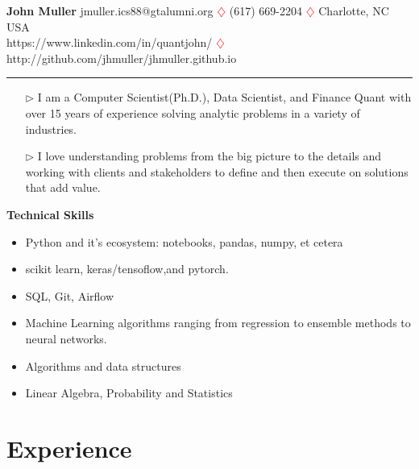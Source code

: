 \documentclass[10pt, letterpaper]{article} %
\author{}
\date{}
\providecommand{\tightlist}{%
  \setlength{\itemsep}{0pt}\setlength{\parskip}{0pt}}
\begin{document}
{\LARGE { \textbf {John Muller}}}
\vspace{0.1in}
\hfill\break
jmuller.ics88@gtalumni.org 
 \textcolor{red} {$\diamondsuit$}  (617) 669-2204  \textcolor{red}{$\diamondsuit$}
 Charlotte, NC USA \hfill 
{} 
 \\
https://www.linkedin.com/in/quantjohn/ 
\textcolor{red}{$\diamondsuit$} http://github.com/jhmuller/jhmuller.github.io 
\\


\vspace{-18pt}
\begin{center}
\rule{0.5\textwidth}{.4pt}
\end{center}
\vspace{-2pt}
\begin{itemize}
\item[$\triangleright$]  I am a Computer Scientist(Ph.D.), Data Scientist, and Finance Quant with over 15 years of experience solving analytic problems in a variety of industries.
\item[$\triangleright$]  I love understanding problems from the big picture to the details and working with clients and stakeholders to define and then execute on solutions that add value. 
 \end{itemize}
{\textbf {Technical Skills}}
\vspace{-7pt}
\begin{multicols}{2}
  \begin{itemize}
	\tightlist
	\item Python and it's ecosystem: notebooks, pandas, numpy, et cetera 
	\item scikit learn, keras/tensoflow,and pytorch.
	\item SQL, Git, Airflow
	\item Machine Learning algorithms ranging from regression to ensemble methods to neural networks.
	\item Algorithms and data structures
	\item Linear Algebra, Probability and Statistics
\end{itemize}
\end{multicols}

\vspace{-5pt}
\hypertarget{professional-experience}{\section{\texorpdfstring{
{ \textbf{ {Experience}}}}{Professional Experience}}\label{professional-experience}}
\end{document}
